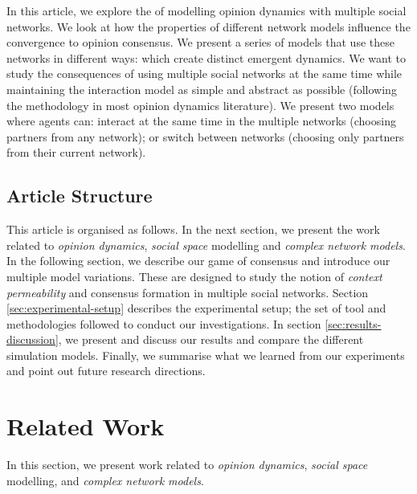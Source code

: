 \documentclass[preprint,number]{elsarticle}
\begin{document}
	In this article, we explore the of modelling opinion dynamics with multiple social
        networks. We look at how the properties of different network models influence the
        convergence to opinion consensus. We present a series of models that use these networks in
        different ways: which create distinct emergent dynamics. We want to study the consequences
        of using multiple social networks at the same time while maintaining the interaction model
        as simple and abstract as possible (following the methodology in most opinion dynamics
        literature). We present two models where agents can: interact at the same time in the
        multiple networks (choosing partners from any network); or switch between networks (choosing
        only partners from their current network).
	
	\subsection{Article Structure}
        \noindent This article is organised as follows. In the next section, we present the work
        related to \textit{opinion dynamics}, \textit{social space} modelling and \textit{complex
          network models}. In the following section, we describe our game of consensus and introduce
        our multiple model variations. These are designed to study the notion of \textit{context
          permeability} and consensus formation in multiple social networks. Section
        \ref{sec:experimental-setup} describes the experimental setup; the set of tool and
        methodologies followed to conduct our investigations. In section
        \ref{sec:results-discussion}, we present and discuss our results and compare the different
        simulation models. Finally, we summarise what we learned from our experiments and point out
        future research directions.
	
	\section{Related Work}
	\label{sec:relatedwork}
        \noindent In this section, we present work related to \textit{opinion dynamics},
        \textit{social space} modelling, and \textit{complex network models}.
\end{document}
